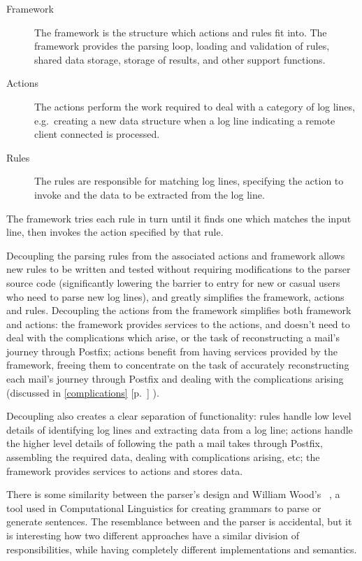 \documentclass[draft]{svmult}
\newcommand{\refwithpage}[1]{%
    \empty{}\ref{#1} [p.~\pageref{#1}]%
}
\newcommand{\sectionref}[1]{%
    \textsection{}\refwithpage{#1}%
}
\begin{document}
\begin{description}

    \item [Framework]  The framework is the structure which actions and
        rules fit into.  The framework provides the parsing loop, loading
        and validation of rules, shared data storage, storage of results,
        and other support functions.

    \item [Actions]  The actions perform the work required to deal with a
        category of log lines, e.g.\ creating a new data structure when a
        log line indicating a remote client connected is processed.

    \item [Rules]  The rules are responsible for matching log lines,
        specifying the action to invoke and the data to be extracted from
        the log line.

\end{description}

The framework tries each rule in turn until it finds one which matches the
input line, then invokes the action specified by that rule.

Decoupling the parsing rules from the associated actions and framework
allows new rules to be written and tested without requiring modifications
to the parser source code (significantly lowering the barrier to entry for
new or casual users who need to parse new log lines), and greatly
simplifies the framework, actions and rules. Decoupling the actions from
the framework simplifies both framework and actions: the framework provides
services to the actions, and doesn't need to deal with the complications
which arise, or the task of reconstructing a mail's journey through
Postfix; actions benefit from having services provided by the framework,
freeing them to concentrate on the task of accurately reconstructing each
mail's journey through Postfix and dealing with the complications arising
(discussed in \sectionref{complications}).

Decoupling also creates a clear separation of functionality: rules handle low
level details of identifying log lines and extracting data from a log line;
actions handle the higher level details of following the path a mail takes
through Postfix, assembling the required data, dealing with complications
arising, etc; the framework provides services to actions and stores data.  

There is some similarity between the parser's design and William Wood's
\ATN{}~\cite{atns, nlpip}, a tool used in Computational Linguistics for
creating grammars to parse or generate sentences.  The resemblance between
\ATN{} and the parser is accidental, but it is interesting how two
different approaches have a similar division of responsibilities, while
having completely different implementations and semantics.
\end{document}
